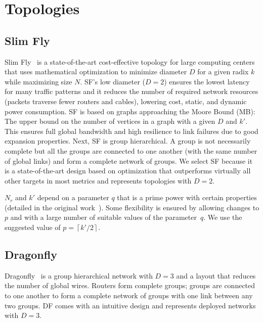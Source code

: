 \section{Topologies}



\subsection{Slim Fly}
 
Slim Fly~\cite{besta2014slim} is a state-of-the-art cost-effective
topology for large computing centers that uses mathematical optimization to
minimize diameter $D$ for a given radix $k$ while maximizing size $N$.  SF's
low diameter ($D = 2$) ensures the lowest latency for many traffic patterns and
it reduces the number of required network resources (packets traverse fewer
routers and cables), lowering cost, static, and dynamic power consumption. 
%
SF is based on graphs approaching the Moore Bound (MB): The upper bound on the
number of vertices in a graph with a given $D$ and $k'$. This ensures full
global bandwidth and high resilience to link failures due to good expansion
properties.
%
Next, SF is group hierarchical. A group is not necessarily complete but all the
groups are connected to one another (with the same number of global links) and
form a complete network of groups.
%
We select SF because it is a state-of-the-art design based on optimization that
outperforms virtually all other targets in most metrics and represents
topologies with $D = 2$.

\noindent
{}
%
$N_r$ and $k'$ depend on a parameter $q$ that is a prime power with certain
properties (detailed in the original work~\cite{besta2014slim}). Some
flexibility is ensured by allowing changes to $p$ and with a large number of
suitable values of the parameter~$q$. We use the suggested value of $p = \left\lceil {k'}/{2}
\right\rceil$.

\subsection{Dragonfly}
 
Dragonfly~\cite{kim2008technology} is a group hierarchical network with $D
= 3$ and a layout that reduces the number of global wires.  Routers form
complete {groups}; groups are connected to one another to form a complete
network of groups with one link between any two groups.
%
DF comes with an intuitive design and represents deployed networks with $D =
3$.

